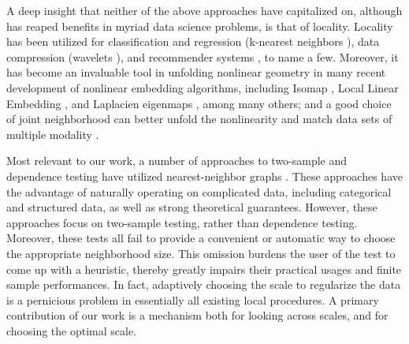 \documentclass[11pt]{article}
\begin{document}
A deep insight that neither of the above approaches have capitalized on, although has reaped benefits in myriad data science problems, is that of locality.  Locality has been utilized for classification and regression (k-nearest neighbors \cite{Stone1977}), data compression (wavelets \cite{Daubeches}), and recommender systems \cite{Sarwar2000}, to name a few. Moreover, it has become an invaluable tool in unfolding nonlinear geometry in many recent development of nonlinear embedding algorithms, including Isomap \cite{TenenbaumSilvaLangford2000, SilvaTenenbaum2003}, Local Linear Embedding \cite{SaulRoweis2000, RoweisSaul2003}, and Laplacien eigenmaps \cite{BelkinNiyogi2003}, among many others; and a good choice of joint neighborhood can better unfold the nonlinearity and match data sets of multiple modality \cite{ShenVogelsteinPriebe2016}.

Most relevant to our work, a number of approaches to two-sample and dependence testing have utilized nearest-neighbor graphs \cite{David1966,Friedman1983,Schilling1986}.  These approaches have the advantage of naturally operating on complicated data, including categorical and structured data, as well as strong theoretical guarantees. However, these approaches focus on two-sample testing, rather than dependence testing. Moreover, these tests all fail to provide  a convenient or automatic way to choose the appropriate neighborhood size.  This omission burdens the user of the test to come up with a heuristic, thereby greatly impairs their practical usages and finite sample performances. In fact, adaptively choosing the scale to regularize the data is a pernicious problem in essentially all existing local procedures. A primary contribution of our work is a mechanism both for looking across scales, and for choosing the optimal scale.  
\end{document}
